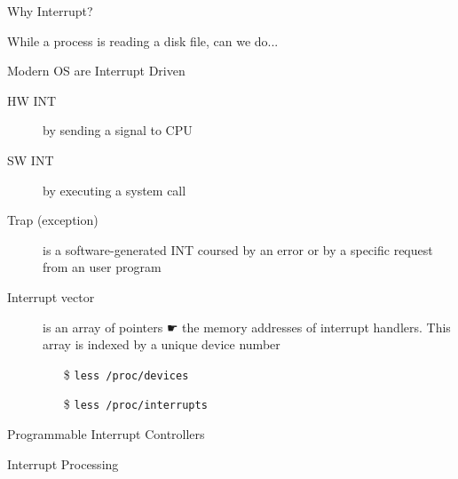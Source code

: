 
\begin{frame}{Why Interrupt?}
  \begin{iblock}{While a process is reading a disk file, can we do...}
    \begin{center}
    \end{center}
  \end{iblock}
\end{frame}

\begin{frame}{Modern OS are Interrupt Driven}
  \begin{description}
  \item[HW INT] by sending a signal to CPU
  \item[SW INT] by executing a \alert{system call}
  \item[Trap (exception)] is a software-generated INT coursed by an error or by a
    specific request from an user program
  \item[Interrupt vector] is an array of pointers ☛ the memory addresses
    of \alert{interrupt handlers}. This array is indexed by a unique device number
    \begin{itemize}
    \item[\$] \texttt{less /proc/devices}
    \item[\$] \texttt{less /proc/interrupts}
    \end{itemize}
  \end{description}
\end{frame}

\begin{frame}{Programmable Interrupt Controllers}
  \begin{center}
  \end{center}
\end{frame}

\begin{frame}{Interrupt Processing}
  \begin{center}
  \end{center}
\end{frame}

